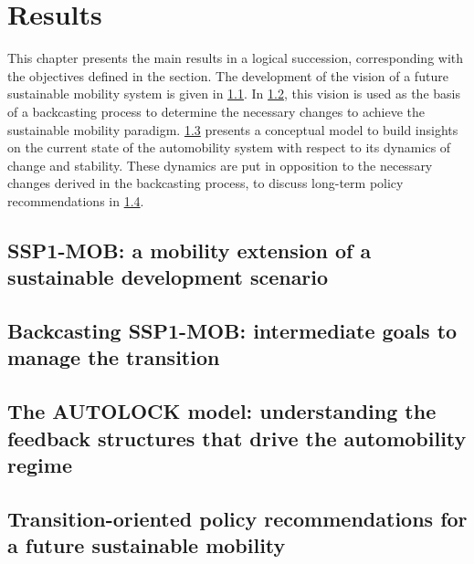 \chapter{Results}
\label{c:results}

This chapter presents the main results in a logical succession, corresponding with the objectives defined in the  section. The development of the vision of a future sustainable mobility system is given in \cref{s:results:ssp1-mob}. In \cref{s:results:backcasting-ssp1-mob}, this vision is used as the basis of a backcasting process to determine the necessary changes to achieve the sustainable mobility paradigm. \cref{s:results:autolock-model} presents a conceptual model to build insights on the current state of the automobility system with respect to its dynamics of change and stability. These dynamics are put in opposition to the necessary changes derived in the backcasting process, to discuss long-term policy recommendations in \cref{s:results:policy-recommendations}.

\section[SSP1-MOB sustainable mobility scenario]{SSP1-MOB: a mobility extension of a sustainable development scenario}
\label{s:results:ssp1-mob}


\section[Backcasting SSP1-MOB]{Backcasting SSP1-MOB: intermediate goals to manage the transition}
\label{s:results:backcasting-ssp1-mob}


\section[The AUTOLOCK model]{The AUTOLOCK model: understanding the feedback structures that drive the automobility regime}
\label{s:results:autolock-model}


\section[Transition-oriented policy recommendations]{Transition-oriented policy recommendations for a future sustainable mobility}
\label{s:results:policy-recommendations}

